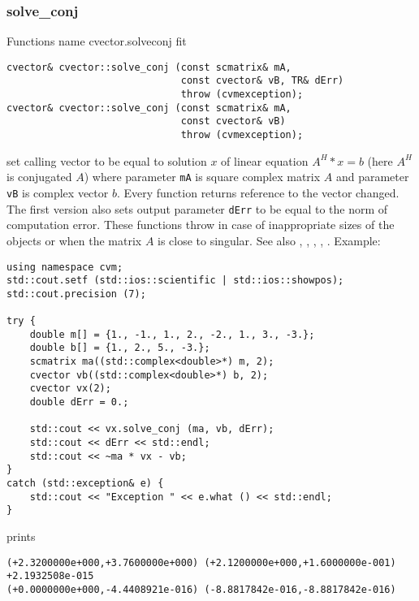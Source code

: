 \subsubsection{solve\_conj}
Functions%
\pdfdest name {cvector.solveconj} fit
\begin{verbatim}
cvector& cvector::solve_conj (const scmatrix& mA,
                              const cvector& vB, TR& dErr)
                              throw (cvmexception);
cvector& cvector::solve_conj (const scmatrix& mA,
                              const cvector& vB)
                              throw (cvmexception);
\end{verbatim}
set calling vector to be equal to solution $x$ of linear equation
$A^H*x=b$ (here $A^H$ is conjugated $A$)
where parameter \verb"mA" is  square complex matrix $A$
and parameter \verb"vB" is  complex vector $b$.
Every function returns  reference to the vector changed.
The first version also sets output parameter \verb"dErr" to be equal
to the norm of computation error.
These functions throw 
in case of inappropriate sizes
of the objects or when the matrix $A$ is close to singular.
See also , , 
, ,
 .
Example:
\begin{Verbatim}
using namespace cvm;
std::cout.setf (std::ios::scientific | std::ios::showpos);
std::cout.precision (7);

try {
    double m[] = {1., -1., 1., 2., -2., 1., 3., -3.};
    double b[] = {1., 2., 5., -3.};
    scmatrix ma((std::complex<double>*) m, 2);
    cvector vb((std::complex<double>*) b, 2);
    cvector vx(2);
    double dErr = 0.;

    std::cout << vx.solve_conj (ma, vb, dErr);
    std::cout << dErr << std::endl;
    std::cout << ~ma * vx - vb;
}
catch (std::exception& e) {
    std::cout << "Exception " << e.what () << std::endl;
}
\end{Verbatim}
prints
\begin{Verbatim}
(+2.3200000e+000,+3.7600000e+000) (+2.1200000e+000,+1.6000000e-001)
+2.1932508e-015
(+0.0000000e+000,-4.4408921e-016) (-8.8817842e-016,-8.8817842e-016)
\end{Verbatim}
\newpage



